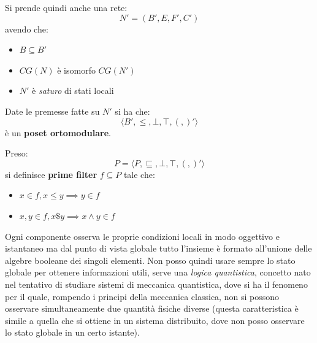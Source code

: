 \documentclass[a4paper,12pt, oneside]{book}
\begin{document}
Si prende quindi anche una rete:
\[N'=(B',E,F',C')\]
avendo che:
\begin{itemize}
  \item $B\subseteq B'$
  \item $CG(N)$ è isomorfo $CG(N')$
  \item $N'$ è \textit{saturo} di stati locali
\end{itemize}
\begin{teorema}
  Date le premesse fatte su $N'$ si ha che:
  \[\langle B', \leq, \bot,\top,(,)'  \rangle\]
  è un \textbf{poset ortomodulare}.
\end{teorema}
\begin{definizione}
  Preso:
  \[P=\langle P, \sqsubseteq, \bot,\top,(,)'  \rangle\]
  si definisce \textbf{prime filter} $f\subseteq P$ tale che:
  \begin{itemize}
    \item $x\in f, x\leq y\implies y\in f$
    \item $x,y\in f, x\$y\implies x\land y\in f$
  \end{itemize}
\end{definizione}
Ogni componente osserva le proprie condizioni locali in modo oggettivo e
istantaneo ma dal punto di vista globale tutto l'insieme è formato all'unione
delle algebre booleane dei singoli elementi. Non posso quindi usare sempre lo
stato globale per ottenere informazioni utili, serve una \textit{logica
  quantistica}, concetto nato nel tentativo di studiare sistemi di meccanica
quantistica, dove si ha il fenomeno per il quale, rompendo i principi della
meccanica classica, non si possono osservare simultaneamente due quantità
fisiche diverse (questa caratteristica è simile a quella che si ottiene in un
sistema distribuito, dove non posso osservare lo stato globale in un certo
istante).   
\end{document}
